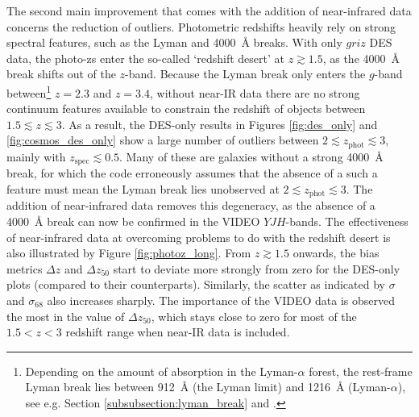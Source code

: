 


The second main improvement that comes with the addition of near-infrared data concerns the reduction of outliers. Photometric redshifts heavily rely on strong spectral features, such as the Lyman and \SI{4000}{\angstrom} breaks. With only $griz$ DES data, the photo-zs enter the so-called `redshift desert' \citep{2001AJ....122.2205R,2006A&A...457..841I} at $z\gtrsim1.5$, as the \SI{4000}{\angstrom} break shifts out of the $z$-band. Because the Lyman break only enters the $g$-band between\footnote{Depending on the amount of absorption in the Lyman-$\alpha$ forest, the rest-frame Lyman break lies between \SI{912}{\angstrom} (the Lyman limit) and \SI{1216}{\angstrom} (Lyman-$\alpha$), see e.g. Section \ref{subsubsection:lyman_break} and \cite{1995ApJ...441...18M}.} $z=2.3$ and $z=3.4$, without near-IR data there are no strong continuum features available to constrain the redshift of objects between $1.5\lesssim z \lesssim 3$. As a result, the DES-only results in Figures \ref{fig:des_only} and \ref{fig:cosmos_des_only} show a large number of outliers between $ 2 \lesssim z_{\mathrm{phot}} \lesssim 3$, mainly with $z_{\mathrm{spec}}\lesssim0.5$. Many of these are galaxies without a strong \SI{4000}{\angstrom} break, for which the code erroneously assumes that the absence of a such a feature must mean the Lyman break lies unobserved at $ 2 \lesssim z_{\mathrm{phot}} \lesssim 3$. The addition of near-infrared data removes this degeneracy, as the absence of a \SI{4000}{\angstrom} break can now be confirmed in the VIDEO $YJH$-bands. The effectiveness of near-infrared data at overcoming problems to do with the redshift desert is also illustrated by Figure \ref{fig:photoz_long}. From $z\gtrsim 1.5$ onwards, the bias metrics $\Delta z$ and $\Delta z_{50}$ start to deviate more strongly from zero for the DES-only plots (compared to their \DESVIDEO counterparts). Similarly, the scatter as indicated by $\sigma$ and $\sigma_{68}$ also increases sharply. The importance of the VIDEO data is observed the most in the value of $\Delta z_{50}$, which stays close to zero for most of the $1.5<z<3$ redshift range when near-IR data is included. \par


